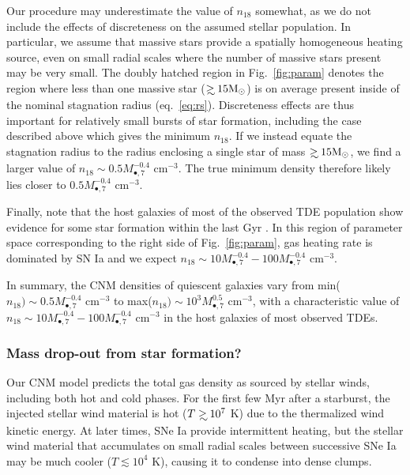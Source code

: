 \documentclass[usenatbib,fleqn]{mnras}
\newcommand\gsim{\mathrel{\rlap{\lower4pt\hbox{\hskip1pt$\sim$}}
    \raise1pt\hbox{$>$}}}
\newcommand{\Mbh}[1][]{M_{\bullet#1}}
\newcommand{\Msun}{{\rm M_\odot}}
\begin{document}
Our procedure may underestimate the value of $n_{18}$ somewhat, as we
do not include the effects of discreteness on the assumed stellar
population.  In particular, we assume that massive stars provide a
spatially homogeneous heating source, even on small radial scales
where the number of massive stars present may be very small.  The
doubly hatched region in Fig.~\ref{fig:param} denotes the region where
less than one massive star ($\gsim 15 \Msun$) is on average present
inside of the nominal stagnation radius (eq.~\ref{eq:rs}).
Discreteness effects are thus important for relatively small bursts of
star formation, including the case described above which gives the
minimum $n_{18}$.  If we instead equate the stagnation radius to the
radius enclosing a single star of mass $\gsim 15 \Msun$, we find a
larger value of $n_{18}\sim 0.5 \Mbh[,7]^{-0.4}$ cm$^{-3}$.  The true
minimum density therefore likely lies closer to $0.5 \Mbh[,7]^{-0.4}$
cm$^{-3}$.

Finally, note that the host galaxies of most of the observed TDE
population show evidence for some star formation within the last Gyr
\citep{French+2016}.  In this region of parameter space corresponding
to the right side of Fig.~\ref{fig:param}, gas heating rate is
dominated by SN Ia and we expect $n_{18}\sim 10 \Mbh[,7]^{-0.4}-100
\Mbh[,7]^{-0.4}$ cm$^{-3}$.

In summary, the CNM densities of quiescent galaxies vary from
min($n_{18}) \sim 0.5 \Mbh[,7]^{-0.4}$ cm$^{-3}$
to max($n_{18})\sim 10^{3} \Mbh[,7]^{0.5}$ cm$^{-3}$, with a
characteristic value of $n_{18}\sim 10 \Mbh[,7]^{-0.4}-100
\Mbh[,7]^{-0.4}$ cm$^{-3}$ in the host galaxies of most observed TDEs.

\subsubsection{Mass drop-out from star formation?}

Our CNM model predicts the total gas density as sourced by
stellar winds, including both hot and cold phases.  For the first few
Myr after a starburst, the injected stellar wind material is hot
($T\gsim 10^{7}$ K) due to the thermalized wind kinetic energy.
At later times, SNe Ia provide intermittent heating, but the stellar wind
material that accumulates on small radial scales between successive SNe Ia
may be much cooler ($T \lesssim 10^{4}$ K), causing it to condense
into dense clumps.
\end{document}
